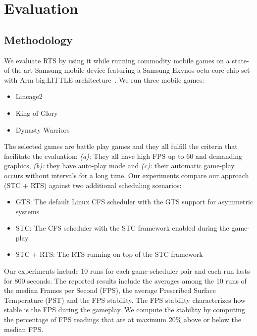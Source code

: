 \section{Evaluation}
\subsection{Methodology}
\label{sec.rts.methodology}
We evaluate RTS by using it while running commodity mobile games on a state-of-the-art Samsung mobile device featuring a Samsung Exynos octa-core chip-set with Arm big.LITTLE architecture~\cite{samsung,Greenhalgh2011}. 
We run three mobile games:
\begin{itemize}
\item Lineage2~\cite{Lineage}
\item King of Glory~\cite{KOG}
\item Dynasty Warriors~\cite{Dynasty}
\end{itemize}
The selected games are battle play games and they all fulfill the criteria that facilitate the evaluation: \textit{(a):} They all have high FPS up to 60 and demanding graphics, \textit{(b):} they have auto-play mode and \textit{(c):} their automatic game-play occurs without intervals for a long time.
Our experiments compare our approach (STC + RTS) against two additional scheduling scenarios:
\begin{itemize}
	\item GTS: The default Linux CFS scheduler with the GTS support for asymmetric systems
	\item STC: The CFS scheduler with the STC framework enabled during the game-play
	\item STC + RTS: The RTS running on top of the STC framework
\end{itemize}
Our experiments include 10 runs for each game-scheduler pair and each run lasts for 800 seconds. 
The reported results include the averages among the 10 runs of the median Frames per Second (FPS), the average Prescribed Surface Temperature (PST) and the FPS stability.
The FPS stability characterizes how stable is the FPS during the gameplay. 
We compute the stability by computing the percentage of FPS readings that are at maximum 20\% above or below the median FPS.
%
%

